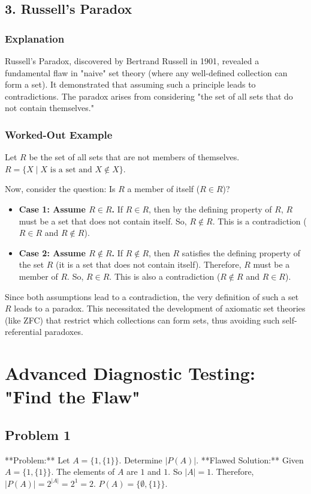 \documentclass{article}
\begin{document}
\begin{itemize}
\begin{itemize}
\begin{itemize}
\begin{enumerate}
\begin{itemize}
\subsection{3. Russell's Paradox}
\subsubsection*{Explanation}
Russell's Paradox, discovered by Bertrand Russell in 1901, revealed a fundamental flaw in "naive" set theory (where any well-defined collection can form a set). It demonstrated that assuming such a principle leads to contradictions. The paradox arises from considering "the set of all sets that do not contain themselves."

\subsubsection*{Worked-Out Example}
Let $R$ be the set of all sets that are not members of themselves.
$R = \{X \mid X \text{ is a set and } X \notin X\}$.

Now, consider the question: Is $R$ a member of itself ($R \in R$)?
\begin{itemize}
    \item \textbf{Case 1: Assume $R \in R$.}
        If $R \in R$, then by the defining property of $R$, $R$ must be a set that does not contain itself. So, $R \notin R$.
        This is a contradiction ($R \in R$ and $R \notin R$).
    \item \textbf{Case 2: Assume $R \notin R$.}
        If $R \notin R$, then $R$ satisfies the defining property of the set $R$ (it is a set that does not contain itself). Therefore, $R$ must be a member of $R$. So, $R \in R$.
        This is also a contradiction ($R \notin R$ and $R \in R$).
\end{itemize}
Since both assumptions lead to a contradiction, the very definition of such a set $R$ leads to a paradox. This necessitated the development of axiomatic set theories (like ZFC) that restrict which collections can form sets, thus avoiding such self-referential paradoxes.

\section{Advanced Diagnostic Testing: "Find the Flaw"}

\subsection{Problem 1}
**Problem:** Let $A = \{1, \{1\}\}$. Determine $|P(A)|$.
**Flawed Solution:**
Given $A = \{1, \{1\}\}$.
The elements of $A$ are $1$ and $1$.
So $|A|=1$.
Therefore, $|P(A)| = 2^{|A|} = 2^1 = 2$.
$P(A) = \{\emptyset, \{1\}\}$.


\end{itemize}
\end{enumerate}
\end{itemize}
\end{itemize}
\end{itemize}
\end{document}
